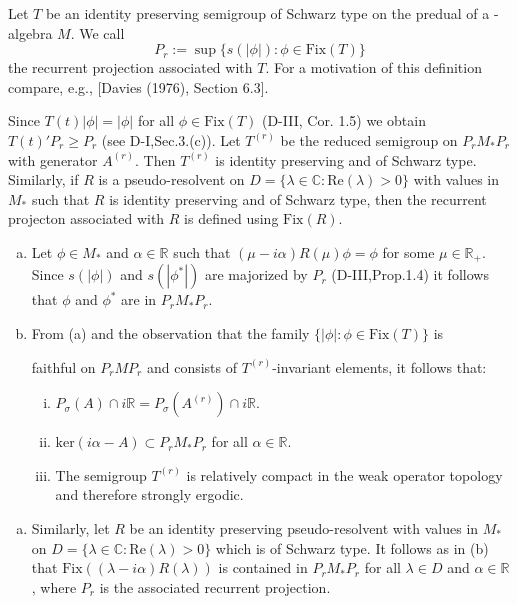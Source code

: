 Let $T$ be an identity preserving semigroup of Schwarz type on the predual of a \WA-algebra $M$.
We call
\[
P_{r} := \sup\{s(|\phi|) : \phi \in \text{Fix}(T)\}
\]
the recurrent projection associated with $T$.
For a motivation of this definition compare, e.g., [Davies (1976), Section 6.3].

Since $T(t)|\phi| = |\phi|$ for all $\phi \in \text{Fix}(T)$ (D-III, Cor. 1.5) we obtain $T(t)'P_{r} \geq P_{r}$ (see D-I,Sec.3.(c)).
Let $T^{(r)}$ be the reduced semigroup on $P_{r}M_{*}P_{r}$ with generator $A^{(r)}$.
Then $T^{(r)}$ is identity preserving and of Schwarz type.
Similarly, if $R$ is a pseudo-resolvent on $D = \{\lambda \in \mathbb{C} : \text{Re}(\lambda) > 0\}$ with values in $M_{*}$ such that $R$ is identity preserving and of Schwarz type, then the recurrent projecton associated with $R$ is defined using $\text{Fix}(R)$.

\begin{remark}\label{rem:d4-3.2}
\begin{enumerate}[(a)]
\item
Let $\phi \in M_{*}$ and $\alpha \in \mathbb{R}$ such that $(\mu - i\alpha)R(\mu)\phi = \phi$ for some $\mu \in \mathbb{R}_{+}$.
Since $s(|\phi|)$ and $s(|\phi^*|)$ are majorized by $P_{r}$ (D-III,Prop.1.4) it follows that $\phi$ and $\phi^*$ are in $P_{r}M_{*}P_{r}$.

\item
From (a) and the observation that the family $\{|\phi| : \phi \in \text{Fix}(T)\}$ is

\newpage

faithful on $P_{r}MP_{r}$ and consists of $T^{(r)}$-invariant elements, it follows that:

\begin{enumerate}[(i)]
\item
$P_{\sigma}(A) \cap i\mathbb{R} = P_{\sigma}(A^{(r)}) \cap i\mathbb{R}$.

\item
$\text{ker}(i\alpha - A) \subset P_{r}M_{*}P_{r}$ for all $\alpha \in \mathbb{R}$.

\item
The semigroup $T^{(r)}$ is relatively compact in the weak operator topology and therefore strongly ergodic.
\end{enumerate}
\end{enumerate}
\end{remark}

\begin{enumerate}[(c)]
\item
Similarly, let $R$ be an identity preserving pseudo-resolvent with values in $M_{*}$ on $D = \{\lambda \in \mathbb{C} : \text{Re}(\lambda) > 0\}$ which is of Schwarz type.
It follows as in (b) that $\text{Fix}((\lambda - i\alpha)R(\lambda))$ is contained in $P_{r}M_{*}P_{r}$ for all $\lambda \in D$ and $\alpha \in \mathbb{R}$, where $P_{r}$ is the associated recurrent projection.
\end{enumerate}

